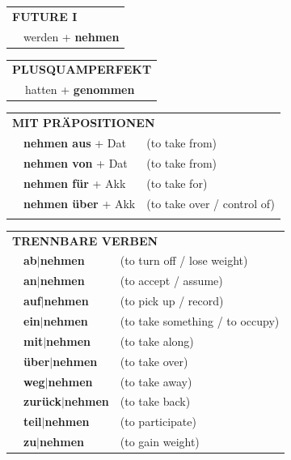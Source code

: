 \documentclass[10pt,a4paper]{revtex4-2}
\begin{document}
\begin{verbbox-acc}
\begin{tabular}{rl}
    \multicolumn{2}{l}{\textbf{FUTURE I} }\\
  &  werden + \textbf{nehmen}\\
 
  \end{tabular}
\hfill
   \begin{tabular}{rl}
      \multicolumn{2}{l}{\textbf{PLUSQUAMPERFEKT}}\\
  &  hatten + \textbf{genommen}\\
  \end{tabular}

    \vspace{10pt}

   \begin{tabular}{lll}
      \multicolumn{3}{l}{\textbf{MIT PRÄPOSITIONEN}}\\
& \textbf{nehmen aus} + Dat & (to take from)\\
& \textbf{nehmen von} + Dat & (to take from)\\
&\textbf{nehmen für} + Akk & (to take for)\\
&\textbf{nehmen über} + Akk & (to take over / control of)\\
\vspace{50pt}
  \end{tabular}
  \hfill
   \begin{tabular}{lll}
      \multicolumn{3}{l}{\textbf{TRENNBARE VERBEN}}\\
      & \textbf{ab$|$nehmen} & (to turn off / lose weight)\\
 & \textbf{an$|$nehmen} & (to accept / assume)\\
 & \textbf{auf$|$nehmen} & (to pick up / record)\\
 & \textbf{ein$|$nehmen} & (to take something / to occupy)\\
  & \textbf{mit$|$nehmen} & (to take along)\\
  & \textbf{über$|$nehmen} & (to take over)\\
  & \textbf{weg$|$nehmen} & (to take away)\\
     & \textbf{zurück$|$nehmen} & (to take back)\\
     & \textbf{teil$|$nehmen} & (to participate)\\
       & \textbf{zu$|$nehmen} & (to gain weight)\\
  \end{tabular}



  \vspace{-5pt}

\end{verbbox-acc}
\end{document}
